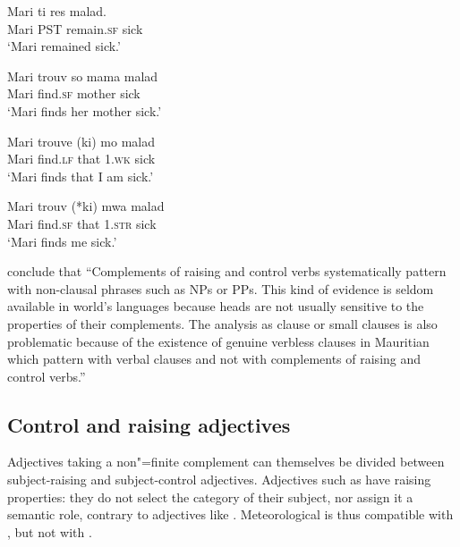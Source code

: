 \documentclass[output=paper
                ,modfonts
                ,nonflat
	        ,collection
	        ,collectionchapter
	        ,collectiontoclongg
 	        ,biblatex
                ,babelshorthands
                ,newtxmath
                ,draftmode
                ,colorlinks, citecolor=brown
]{./langsci/langscibook}
\begin{document}
\begin{exe}
\ex \begin{xlist}
\ex 
\gll Mari ti res  malad.\\
     Mari PST remain.\textsc{sf} sick\\\hfill\citep[]{HenriandLaurens2011}
\glt `Mari remained sick.'

\ex 
\gll Mari trouv  so mama malad\\
     Mari find.\textsc{sf} \POSS{} mother sick\\
\glt `Mari finds her mother sick.'

\ex 
\gll Mari trouve (ki) mo malad\\
     Mari find.\textsc{lf} that 1\SG.\textsc{wk} sick\\
\glt `Mari finds that I am sick.'

\ex 
\gll Mari trouv (*ki) mwa malad\\
     Mari find.\textsc{sf} that 1\SG.\textsc{str} sick\\
\glt `Mari finds me sick.'
\end{xlist}
\end{exe}

\citet[]{HenriandLaurens2011} conclude that ``Complements of raising and control verbs systematically pattern with non-clausal phrases such as NPs or PPs. This kind of evidence is seldom available in world's languages because heads are not usually sensitive to the properties of their complements. The analysis as clause or small clauses is also problematic because of the existence of genuine verbless clauses in Mauritian which pattern with verbal clauses and not with complements of raising and control verbs.''

\subsection{Control and raising adjectives}

Adjectives taking a non"=finite complement can themselves be divided between subject-raising and subject-control adjectives. Adjectives such as  have raising properties: they do not select the category of their subject, nor assign it a semantic role, contrary to adjectives like . Meteorological  is thus compatible with , but not with .

\eal
{}
\zl
\end{document}
